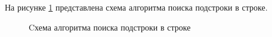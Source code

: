 На рисунке \ref{fig:subsearch} представлена схема алгоритма поиска подстроки в строке.
\captionsetup{justification=centering,singlelinecheck=false}
\begin{figure}[H]
	\caption{Cхема алгоритма поиска подстроки в строке}
	\label{fig:subsearch}
\end{figure}
\newpage


